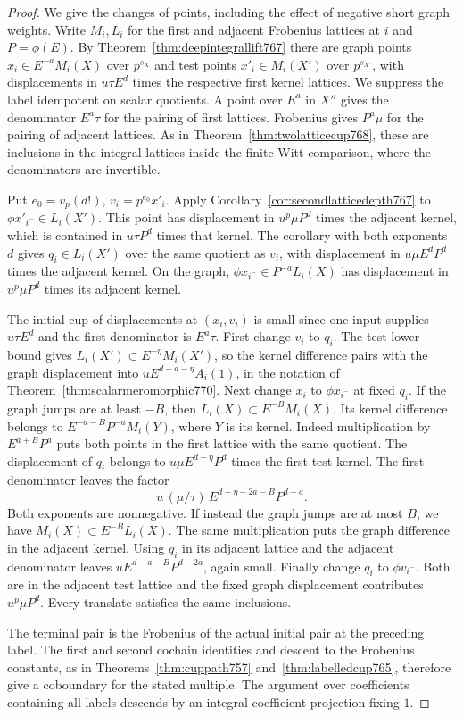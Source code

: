 \documentclass[a4paper,11pt]{article}
\theoremstyle{definition}
\theoremstyle{remark}
\numberwithin{equation}{section}
\begin{document}
\begin{proof}
We give the changes of points, including the effect of
negative short graph weights. Write \(M_i,L_i\) for the
first and adjacent Frobenius lattices at \(i\) and
\(P=\phi(E)\). By Theorem~\ref{thm:deepintegrallift767}
there are graph points \(x_i\in E^{-a}M_i(X)\) over
\(p^{s_X}\) and test points \(x'_i\in M_i(X')\) over
\(p^{s_{X'}}\), with displacements in \(u\tau E^d\)
times the respective first kernel lattices. We suppress
the label idempotent on scalar quotients. A point over
\(E^a\) in \(X''\) gives the denominator \(E^a\tau\)
for the pairing of first lattices. Frobenius gives
\(P^a\mu\) for the pairing of adjacent lattices.
As in Theorem~\ref{thm:twolatticecup768}, these are
inclusions in the integral lattices inside the finite
Witt comparison, where the denominators are invertible.

Put \(e_0=v_p(d!)\), \(v_i=p^{e_0}x'_i\).
Apply Corollary~\ref{cor:secondlatticedepth767} to
\(\phi x'_{i^-}\in L_i(X')\). This point has displacement
in \(u^p\mu P^d\) times the adjacent kernel, which is
contained in \(u\tau P^d\) times that kernel. The corollary
with both exponents \(d\) gives \(q_i\in L_i(X')\) over
the same quotient as \(v_i\), with displacement in
\(u\mu E^d P^d\) times the adjacent kernel. On the graph,
\(\phi x_{i^-}\in P^{-a}L_i(X)\) has displacement in
\(u^p\mu P^d\) times its adjacent kernel.

The initial cup of displacements at \((x_i,v_i)\) is
small since one input supplies \(u\tau E^d\) and the first
denominator is \(E^a\tau\). First change \(v_i\) to \(q_i\).
The test lower bound gives \(L_i(X')\subset E^{-\eta}M_i(X')\),
so the kernel difference pairs with the graph displacement
into \(uE^{d-a-\eta}A_i(1)\), in the notation of
Theorem~\ref{thm:scalarmeromorphic770}. Next change \(x_i\)
to \(\phi x_{i^-}\) at fixed \(q_i\).
If the graph jumps are at least \(-B\), then
\(L_i(X)\subset E^{-B}M_i(X)\).
Its kernel difference belongs to
\(E^{-a-B}P^{-a} M_i(Y)\), where \(Y\) is its kernel.
Indeed multiplication by \(E^{a+B}P^a\) puts both points
in the first lattice with the same quotient. The displacement
of \(q_i\) belongs to \(u\mu E^{d-\eta}P^d\) times the first
test kernel. The first denominator leaves the factor
\[
        u\,(\mu/\tau)\,E^{d-\eta-2a-B}P^{d-a}.
\]
Both exponents are nonnegative. If instead the graph jumps
are at most \(B\), we have \(M_i(X)\subset E^{-B}L_i(X)\).
The same multiplication puts the graph difference in the
adjacent kernel. Using \(q_i\) in its adjacent lattice
and the adjacent denominator leaves
\(uE^{d-a-B}P^{d-2a}\), again small. Finally change \(q_i\)
to \(\phi v_{i^-}\). Both are in the adjacent test lattice
and the fixed graph displacement contributes
\(u^p\mu P^d\). Every translate satisfies the same inclusions.

The terminal pair is the Frobenius of the actual initial
pair at the preceding label. The first and second cochain
identities and descent to the Frobenius constants, as in
Theorems~\ref{thm:cuppath757} and~\ref{thm:labelledcup765},
therefore give a coboundary for the stated multiple. The
argument over coefficients containing all labels descends
by an integral coefficient projection fixing \(1\).
\end{proof}
\end{document}
